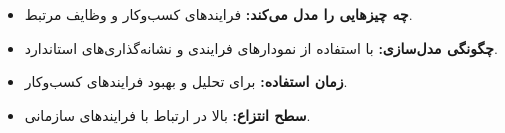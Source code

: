 \section*{}
\begin{itemize}
	\item \textbf{چه چیزهایی را مدل می‌کند:} فرایندهای کسب‌وکار و وظایف مرتبط.
	\item \textbf{چگونگی مدل‌سازی:} با استفاده از نمودارهای فرایندی و نشانه‌گذاری‌های استاندارد.
	\item \textbf{زمان استفاده:} برای تحلیل و بهبود فرایندهای کسب‌وکار.
	\item \textbf{سطح انتزاع:} بالا در ارتباط با فرایندهای سازمانی.
\end{itemize}


